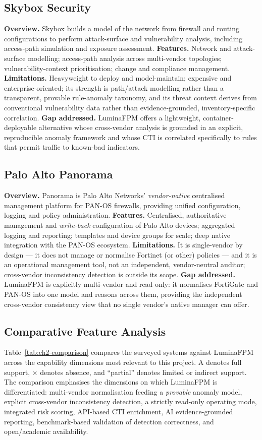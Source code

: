 \subsection{Skybox Security}
\textbf{Overview.} Skybox builds a model of the network from firewall and routing configurations to perform attack-surface and vulnerability analysis, including access-path simulation and exposure assessment.
\textbf{Features.} Network and attack-surface modelling; access-path analysis across multi-vendor topologies; vulnerability-context prioritisation; change and compliance management.
\textbf{Limitations.} Heavyweight to deploy and model-maintain; expensive and enterprise-oriented; its strength is path/attack modelling rather than a transparent, provable rule-anomaly taxonomy, and its threat context derives from conventional vulnerability data rather than evidence-grounded, inventory-specific correlation.
\textbf{Gap addressed.} LuminaFPM offers a lightweight, container-deployable alternative whose cross-vendor analysis is grounded in an explicit, reproducible anomaly framework and whose CTI is correlated specifically to rules that permit traffic to known-bad indicators.

\subsection{Palo Alto Panorama}
\textbf{Overview.} Panorama is Palo Alto Networks' \emph{vendor-native} centralised management platform for PAN-OS firewalls, providing unified configuration, logging and policy administration.
\textbf{Features.} Centralised, authoritative management and \emph{write-back} configuration of Palo Alto devices; aggregated logging and reporting; templates and device groups for scale; deep native integration with the PAN-OS ecosystem.
\textbf{Limitations.} It is single-vendor by design --- it does not manage or normalise Fortinet (or other) policies --- and it is an operational management tool, not an independent, vendor-neutral auditor; cross-vendor inconsistency detection is outside its scope.
\textbf{Gap addressed.} LuminaFPM is explicitly multi-vendor and read-only: it normalises FortiGate and PAN-OS into one model and reasons across them, providing the independent cross-vendor consistency view that no single vendor's native manager can offer.

\subsection{Comparative Feature Analysis}
\label{sec:ch2-comparison}
Table~\ref{tab:ch2-comparison} compares the surveyed systems against LuminaFPM across the capability dimensions most relevant to this project. A \checkmark{} denotes full support, $\times$ denotes absence, and ``partial'' denotes limited or indirect support. The comparison emphasises the dimensions on which LuminaFPM is differentiated: multi-vendor normalisation feeding a \emph{provable} anomaly model, explicit cross-vendor inconsistency detection, a strictly read-only operating mode, integrated risk scoring, API-based CTI enrichment, AI evidence-grounded reporting, benchmark-based validation of detection correctness, and open/academic availability.

